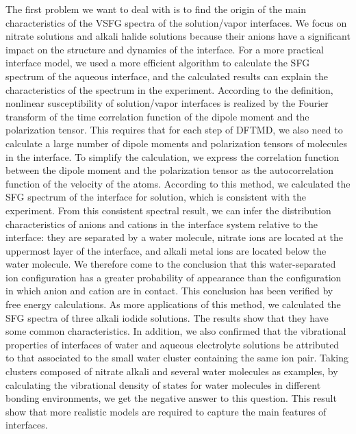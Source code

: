 The first problem we want to deal with is to find the origin of the main characteristics of the
VSFG spectra of the solution/vapor interfaces.
We focus on nitrate solutions and alkali halide solutions because their anions have a significant impact on the structure and dynamics of the interface.
For a more practical interface model, we used a more efficient algorithm to calculate the SFG spectrum of the aqueous interface, 
and the calculated results can explain the characteristics of the spectrum in the experiment. 
According to the definition, nonlinear susceptibility of solution/vapor interfaces is realized by the Fourier transform of 
the time correlation function of the dipole moment and the polarization tensor. This requires that for each step of DFTMD, 
we also need to calculate a large number of dipole moments and polarization tensors of molecules in the interface. 
To simplify the calculation, we express the correlation function between the dipole moment and the polarization tensor 
as the autocorrelation function of the velocity of the atoms. According to this method, we calculated the SFG spectrum of the interface for \LiN solution,
which is consistent with the experiment. From this consistent spectral result, we can infer the distribution characteristics of anions 
and cations in the interface system relative to the interface: they are separated by a water molecule, nitrate ions are located at the uppermost layer of the interface, 
and alkali metal ions are located below the water molecule. We therefore come to the conclusion that this water-separated ion configuration 
has a greater probability of appearance than the configuration in which anion and cation are in contact.
This conclusion has been verified by free energy calculations. 
As more applications of this method, we calculated the SFG spectra of three alkali iodide solutions. 
The results show that they have some common characteristics. 
In addition, we also confirmed that the vibrational properties of interfaces of water and aqueous electrolyte solutions be attributed to 
that associated to the small water cluster containing the same ion pair.
Taking clusters composed of nitrate alkali and several water molecules as examples, by calculating the vibrational density of states 
for water molecules in different bonding environments, we get the negative answer to this question. 
This result show that more realistic models are required to capture the main features of interfaces.


